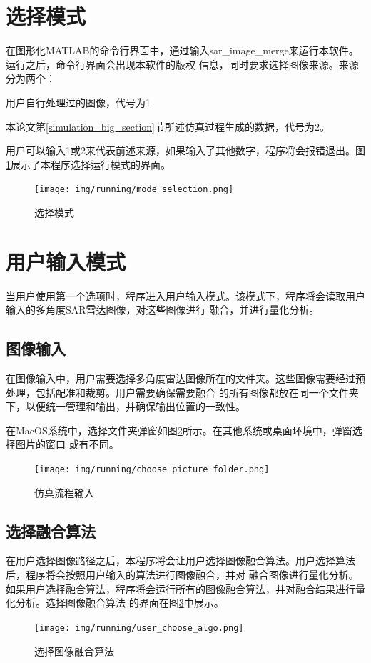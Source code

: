 \documentclass{xduugthesis}
\begin{document}
\section{选择模式}
在图形化MATLAB的命令行界面中，通过输入sar\_image\_merge来运行本软件。运行之后，命令行界面会出现本软件的版权
信息，同时要求选择图像来源。来源分为两个：
\begin{compactenum}
	\item 用户自行处理过的图像，代号为1
	\item 本论文第\ref{simulation_big_section}节所述仿真过程生成的数据，代号为2。
\end{compactenum}
用户可以输入1或2来代表前述来源，如果输入了其他数字，程序将会报错退出。图\ref{mode_selection}展示了本程序选择运行模式的界面。
\begin{figure}[!htb]
	\centering
	\texttt{[image: img/running/mode\_selection.png]}
	\caption{选择模式}\label{mode_selection}
\end{figure}
\section{用户输入模式}
当用户使用第一个选项时，程序进入用户输入模式。该模式下，程序将会读取用户输入的多角度SAR雷达图像，对这些图像进行
融合，并进行量化分析。
\subsection{图像输入}
在图像输入中，用户需要选择多角度雷达图像所在的文件夹。这些图像需要经过预处理，包括配准和裁剪。用户需要确保需要融合
的所有图像都放在同一个文件夹下，以便统一管理和输出，并确保输出位置的一致性。\par
在MacOS系统中，选择文件夹弹窗如图\ref{choose_picture_folder}所示。在其他系统或桌面环境中，弹窗选择图片的窗口
或有不同。\par
\begin{figure}[!htb]
	\centering
	\texttt{[image: img/running/choose\_picture\_folder.png]}
	\caption{仿真流程输入}\label{choose_picture_folder}
\end{figure}\par
\subsection{选择融合算法}
在用户选择图像路径之后，本程序将会让用户选择图像融合算法。用户选择算法后，程序将会按照用户输入的算法进行图像融合，并对
融合图像进行量化分析。如果用户选择融合算法，程序将会运行所有的图像融合算法，并对融合结果进行量化分析。选择图像融合算法
的界面在图\ref{user_choose_algo}中展示。\par
\begin{figure}[!htb]
	\centering
	\texttt{[image: img/running/user\_choose\_algo.png]}
	\caption{选择图像融合算法}\label{user_choose_algo}
\end{figure}\par
\end{document}
